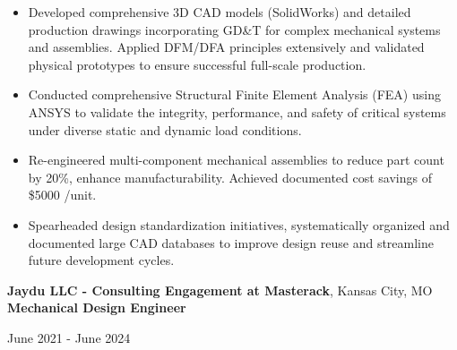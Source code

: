\documentclass[11pt, letterpaper]{article}
\begin{document}
\begin{itemize}[leftmargin=*, label=\textbullet]
\setlength\itemsep{-2pt}
\vspace{-8pt}
\item Developed comprehensive 3D CAD models (SolidWorks) and detailed production drawings incorporating GD\&T for complex mechanical systems and assemblies. Applied DFM/DFA principles extensively and validated physical prototypes to ensure successful full-scale production.
\item Conducted comprehensive Structural Finite Element Analysis (FEA) using ANSYS to validate the integrity, performance, and safety of critical systems under diverse static and dynamic load conditions. 
\item Re-engineered multi-component mechanical assemblies to reduce part count by 20\%, enhance manufacturability. Achieved documented cost savings of \$5000 /unit.
\item Spearheaded design standardization initiatives, systematically organized and documented large CAD databases to improve design reuse and streamline future development cycles.
\end{itemize}\vspace{-8pt}
\vspace{8pt} %
\textbf{Jaydu LLC - Consulting Engagement at Masterack}, Kansas City, MO\\
\textbf{Mechanical Design Engineer}\hfill \raggedright{June 2021 - June 2024}\\ %
\end{document}
